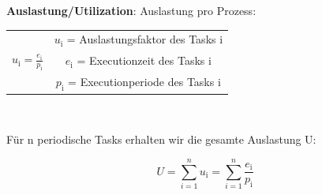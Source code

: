\begin{multicols}{2}
  \textbf{Auslastung/Utilization}:
  Auslastung pro Prozess:
  \begin{center}
    \begin{tabular}{c c}
                                                   & $u_\text{i}$ = Auslastungsfaktor des Tasks i \\
      $u_\text{i} = \frac{e_\text{i}}{p_\text{i}}$ & $e_\text{i}$ = Executionzeit des
      Tasks i                                                                                     \\
                                                   & $p_\text{i}$ = Executionperiode des Tasks i
    \end{tabular}\\
  \end{center}

  \columnbreak

  Für n periodische Tasks erhalten wir die gesamte Auslastung U:
  \begin{center}
    \begin{equation}
      U = \sum_{i=1}^{n}u_\text{i} = \sum_{i=1}^{n}\frac{e_\text{i}}{p_\text{i}}
    \end{equation}
  \end{center}
\end{multicols}
